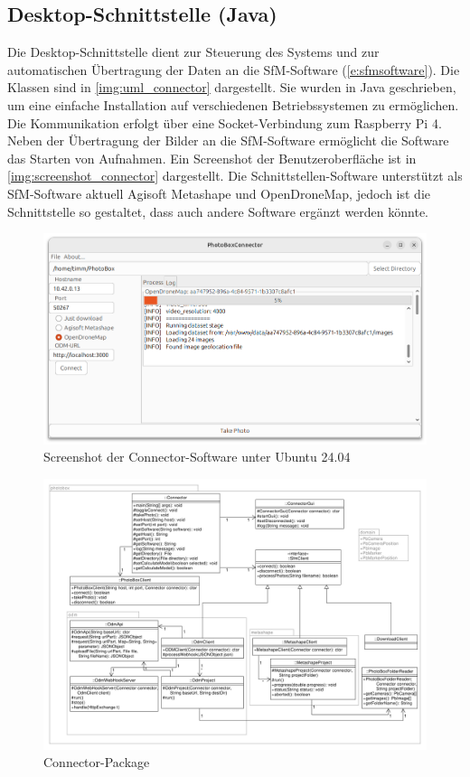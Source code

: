 \documentclass[./00PhotoBox.tex]{subfiles}
\begin{document}
\subsection{Desktop-Schnittstelle (Java)}
Die Desktop-Schnittstelle dient zur Steuerung des Systems und zur automatischen Über\-tragung der Daten an die SfM-Software (\autoref{e:sfmsoftware}). Die Klassen sind in \autoref{img:uml_connector} dargestellt. Sie wurden in Java geschrieben, um eine einfache Installation auf verschiedenen Betriebssystemen zu ermöglichen. Die Kommunikation erfolgt über eine Socket-Verbindung zum Raspberry Pi 4. Neben der Übertragung der Bilder an die SfM-Software ermöglicht die Software das Starten von Aufnahmen. Ein Screenshot der Benutzeroberfläche ist in \autoref{img:screenshot_connector} dargestellt. Die Schnittstellen-Software unterstützt als SfM-Software aktuell Agisoft Metashape und OpenDroneMap, jedoch ist die Schnittstelle so gestaltet, dass auch andere Software ergänzt werden könnte.


\begin{figure}
  \centering
  \includegraphics[width=1\textwidth]{./img/connector_screenshot.png}
  \caption{Screenshot der Connector-Software unter Ubuntu 24.04} %
  \label{img:screenshot_connector} %
\end{figure}

\begin{figure}
  \centering
  \includegraphics[width=1\textwidth]{./img/uml/uml_connector_classdiagramm.pdf}
  \caption{Connector-Package} %
  \label{img:uml_connector} %
\end{figure}

\biblio
\end{document}
